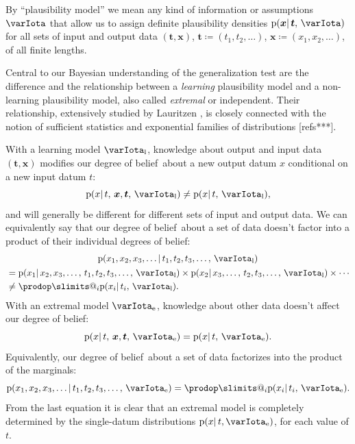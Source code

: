 \documentclass[\ifafour a4paper,12pt,\else a5paper,10pt,\fi%
onecolumn,oneside,article,%
british%
]{memoir}
\makeatletter
\theoremstyle{remark}
\theoremstyle{innote}
\def\prod{\DOTSI\prodop\slimits@}
\newcommand*{\citey}{\parencites*}
\newcommand*{\defd}{\coloneqq}
\newcommand*{\pf}{\mathrm{p}}%
\renewcommand*{\|}{\mathpunct{|}}
\newcommand*{\dob}{degree of belief}
\newcommand*{\dobs}{degrees of belief}
\newcommand*{\yI}{\varIota}
\newcommand*{\yIl}{\yI_{\textrm{l}}}
\newcommand*{\yIe}{\yI_{\textrm{e}}}
\newcommand*{\yt}{\bm{t}}
\newcommand*{\yx}{\bm{x}}
\makeatother
\begin{document}
By \enquote{plausibility model} we mean any kind of information or
assumptions $\yI$ that allow us to assign definite plausibility densities
$\pf(\yx \| \yt,\, \yI)$ for all sets of input and output data
$(\yt, \yx)$, $\yt\defd (t_1, t_2, \dotsc)$,
$\yx \defd (x_1, x_2, \dotsc)$, of all finite lengths.

Central to our Bayesian understanding of the generalization test are the
difference and the relationship between a \emph{learning} plausibility
model and a non-learning plausibility model, also called \emph{extremal} or
independent. Their relationship, extensively studied by Lauritzen
\citey{lauritzen1974,lauritzen1974_r1974,lauritzen1982_r1988,lauritzen1984},
is closely connected with the notion of sufficient statistics and
exponential families of distributions [refs***].

With a learning model $\yIl$, knowledge about output and input data
$(\yt, \yx)$ modifies our \dob\ about a new output datum $x$ conditional on
a new input datum $t$:
\begin{equation}
  \label{eq:learning_model}
  \pf(x \| t,\, \yx, \yt, \, \yIl) \ne
  \pf(x \| t,\, \yIl),
\end{equation}
and will generally be different for different sets of input and output
data. We can equivalently say that our \dob\ about a set of data doesn't
factor into a product of their individual \dobs:
\begin{multline}
  \label{eq:learning_model_dependent}
  \pf(x_1, x_2, x_3, \dotsc \| t_1, t_2, t_3, \dotsc,\, \yIl)\\
  \!\begin{aligned}[b]
  &=\pf(x_1 \| x_2, x_3, \dotsc,\,  t_1, t_2, t_3, \dotsc,\, \yIl) \times
  \pf(x_2 \| x_3, \dotsc,\,  t_2, t_3, \dotsc,\, \yIl) \times
    \dotsb
    \\
      &\ne %
     \prod_i   \pf(x_i \| t_i,\, \yIl).
  \end{aligned}
\end{multline}
With an extremal model $\yIe$, knowledge about other data doesn't affect
our \dob:
\begin{equation}
  \label{eq:extremal_model}
  \pf(x \| t,\, \yx, \yt, \, \yIe) =
  \pf(x \| t,\, \yIe).
\end{equation}
Equivalently, our \dob\ about a set of data factorizes into the product of
the marginals:
\begin{equation}
  \label{eq:extremal_model_independent}
  \pf(x_1, x_2, x_3, \dotsc \| t_1, t_2, t_3, \dotsc,\, \yIe)
  = %
  \prod_i   \pf(x_i \| t_i,\, \yIe).
\end{equation}
From the last equation it is clear that an extremal model is completely
determined by the single-datum distributions $\pf(x \| t, \yIe)$, for each
value of $t$.
\end{document}
